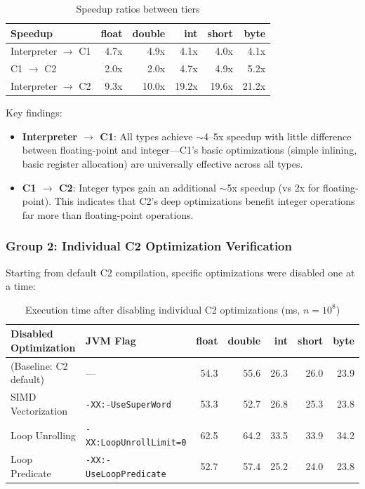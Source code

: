 \documentclass[12pt,a4paper]{article}
\begin{document}
\begin{table}[H]
\centering
\begin{tabular}{l r r r r r}
\toprule
Speedup & float & double & int & short & byte \\
\midrule
Interpreter $\to$ C1 & 4.7x & 4.9x & 4.1x & 4.0x & 4.1x \\
C1 $\to$ C2          & 2.0x & 2.0x & 4.7x & 4.9x & 5.2x \\
Interpreter $\to$ C2 & 9.3x & 10.0x & 19.2x & 19.6x & 21.2x \\
\bottomrule
\end{tabular}
\caption{Speedup ratios between tiers}
\end{table}

Key findings:
\begin{itemize}
  \item \textbf{Interpreter $\to$ C1}: All types achieve ${\sim}$4--5x speedup with little difference between floating-point and integer---C1's basic optimizations (simple inlining, basic register allocation) are universally effective across all types.
  \item \textbf{C1 $\to$ C2}: Integer types gain an additional ${\sim}$5x speedup (vs 2x for floating-point). This indicates that C2's deep optimizations benefit integer operations far more than floating-point operations.
\end{itemize}

\subsubsection*{Group 2: Individual C2 Optimization Verification}

Starting from default C2 compilation, specific optimizations were disabled one at a time:

\begin{table}[H]
\centering
\begin{tabular}{l l r r r r r}
\toprule
Disabled Optimization & JVM Flag & float & double & int & short & byte \\
\midrule
(Baseline: C2 default) & ---                           & 54.3  & 55.6  & 26.3  & 26.0  & 23.9  \\
SIMD Vectorization     & \texttt{-XX:-UseSuperWord}     & 53.3  & 52.7  & 26.8  & 25.3  & 23.8  \\
Loop Unrolling         & \texttt{-XX:LoopUnrollLimit=0} & 62.5  & 64.2  & 33.5  & 33.9  & 34.2  \\
Loop Predicate         & \texttt{-XX:-UseLoopPredicate} & 52.7  & 57.4  & 25.2  & 24.0  & 23.8  \\
\bottomrule
\end{tabular}
\caption{Execution time after disabling individual C2 optimizations (ms, $n=10^8$)}
\end{table}
\end{document}
